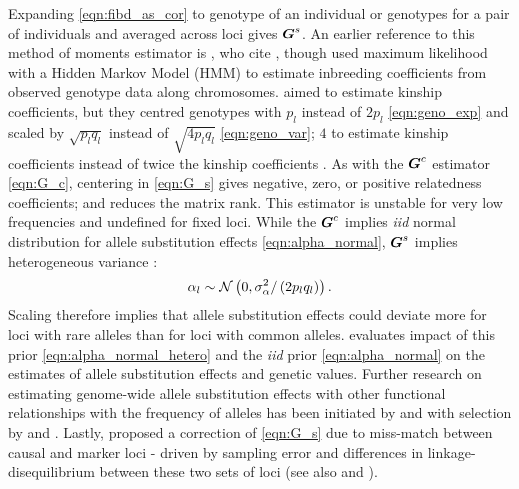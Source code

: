 %
Expanding \eqref{eqn:fibd_as_cor} to genotype of an individual or
genotypes for a pair of individuals and averaged across loci gives
$\boldsymbol{G}^{s}$.
%
An earlier reference to this method of moments estimator is \cite{amin2007genomic},
who cite \cite{leutenegger2003estimation}, though
\cite{leutenegger2003estimation} used maximum likelihood with a Hidden Markov
Model (HMM) to estimate inbreeding coefficients from observed genotype data
along chromosomes.
%
\cite{amin2007genomic} aimed to estimate kinship coefficients, but they centred
genotypes with $p_l$ instead of $2p_l$ \eqref{eqn:geno_exp} and scaled by
$\sqrt{p_l q_l}$ instead of $\sqrt{4 p_l q_l}$ \eqref{eqn:geno_var}; $4$ to
estimate kinship coefficients instead of twice the kinship coefficients
\citep{astle2009population}.
%
As with the $\boldsymbol{G}^{c}$ estimator \eqref{eqn:G_c}, centering in
\eqref{eqn:G_s} gives negative, zero, or positive relatedness coefficients;
and reduces the matrix rank.
%
This estimator is unstable for very low frequencies and undefined for
fixed loci.
%
While the $\boldsymbol{G}^{c}$ implies \textit{iid} normal distribution for
allele substitution effects \eqref{eqn:alpha_normal}, $\boldsymbol{G}^{s}$ 
implies heterogeneous variance \citep{speed2012improved}:
%
\begin{equation} \label{eqn:alpha_normal_hetero}
  \alpha_l \sim \mathcal{N}\left(0, \sigma_{\alpha}^2 / \left(2 p_l q_l\right) \right).
\end{equation}
%
Scaling therefore implies that allele substitution effects could
deviate more for loci with rare alleles than for loci with common alleles.
%
\citep{bouwman2017estimated} evaluates impact of
this prior \eqref{eqn:alpha_normal_hetero} and
the \textit{iid} prior \eqref{eqn:alpha_normal} on
the estimates of allele substitution effects and genetic values.
%
Further research on estimating genome-wide allele substitution effects
with other functional relationships with the frequency of alleles has been
initiated by \cite{speed2012improved} and with selection by
\cite{zeng2018signatures} and \cite{speed2022snp}.
%
Lastly, \cite{yang2010common} proposed a correction of
\eqref{eqn:G_s} due to miss-match between causal and marker loci -
driven by sampling error and differences in linkage-disequilibrium
between these two sets of loci (see also \cite{speed2012improved}
and \cite{deloscampos2015genomic}).

